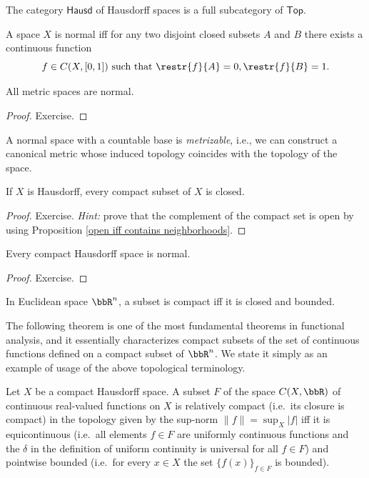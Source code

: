 \begin{example}
The category $\mathsf{Hausd}$ of Hausdorff spaces is a full subcategory of $\mathsf{Top}$.
\end{example}

\begin{thm}
A space $X$ is normal iff for any two disjoint closed subsets $A$ and $B$ there exists a continuous function
\begin{equation}
f\in C(X,[0,1]) ~\text{such that}~ \restr{f}{A} = 0, \restr{f}{B} = 1.
\end{equation}
\end{thm}

\begin{thm}
All metric spaces are normal.
\end{thm}
\begin{proof}
Exercise.
\end{proof}

\begin{thm}[Urysohn]
A normal space with a countable base is \emph{metrizable}, i.e., we can construct a canonical metric whose induced topology coincides with the topology of the space.
\end{thm}

\begin{prop}
If $X$ is Hausdorff, every compact subset of $X$ is closed.
\end{prop}
\begin{proof}
Exercise. \emph{Hint:} prove that the complement of the compact set is open by using Proposition \ref{open iff contains neighborhoods}.
\end{proof}

\begin{prop}
Every compact Hausdorff space is normal.
\end{prop}
\begin{proof}
Exercise.
\end{proof}

\begin{thm}
In Euclidean space $\bbR^n$, a subset is compact iff it is closed and bounded.
\end{thm}

The following theorem is one of the most fundamental theorems in functional analysis, and it essentially characterizes compact subsets of the set of continuous functions defined on a compact subset of $\bbR^n$. We state it simply as an example of usage of the above topological terminology.
\begin{thm}
Let $X$ be a compact Hausdorff space. A subset $F$ of the space $C(X,\bbR )$ of continuous real-valued functions on $X$ is relatively compact (i.e.\ its closure is compact) in the topology given by the sup-norm $\lVert f\rVert=\sup_X \vert f\rvert$ iff it is equicontinuous (i.e.\ all elements $f\in F$ are uniformly continuous functions and the $\delta$ in the definition of uniform continuity is universal for all $f\in F$) and pointwise bounded (i.e.\ for every $x\in X$ the set $\{f(x)\}_{f\in F}$ is bounded).
\end{thm}

